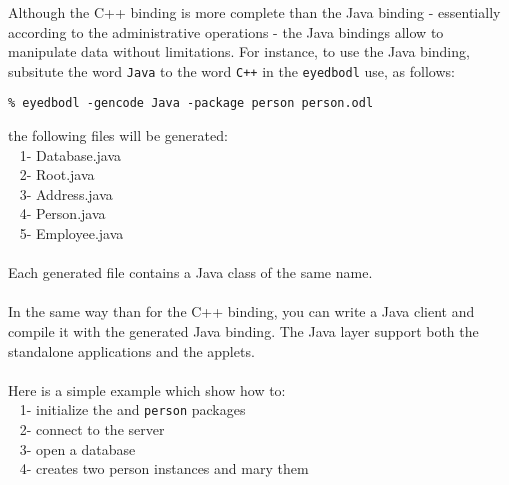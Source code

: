 Although the C++ binding is more complete than the Java binding
- essentially according to the administrative operations - the Java
bindings allow to manipulate data without limitations.
For instance, to use the Java binding, subsitute the word \texttt{Java}
to the word \texttt{C++} in the \texttt{eyedbodl} use, as follows:
\verbsize \begin{verbatim}
% eyedbodl -gencode Java -package person person.odl
\end{verbatim}
\normalsize
the following files will be generated:\\
\mbox{ } 1- Database.java\\
\mbox{ } 2- Root.java\\
\mbox{ } 3- Address.java\\
\mbox{ } 4- Person.java\\
\mbox{ } 5- Employee.java\\
\\
Each generated file contains a Java class of the same name.
\\
\\
In the same way than for the C++ binding, you can write a Java client and
compile it with the generated Java binding.
The Java layer support both the standalone applications and the applets.
\\
\\
Here is a simple example which show how to:\\
\mbox{ } 1- initialize the \eyedb and \texttt{person} packages\\
\mbox{ } 2- connect to the \eyedb server\\
\mbox{ } 3- open a database\\
\mbox{ } 4- creates two person instances and mary them
